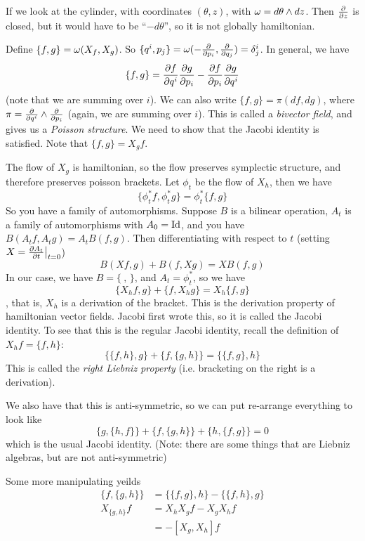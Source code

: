  If we look at the cylinder, with coordinates $(\theta,z)$, with
 $\omega=d\theta\wedge dz$.  Then $\frac{\partial }{\partial z}$ is closed, but it would
 have to be ``$-d\theta$'', so it is not globally hamiltonian.

 Define $\{f,g\} = \omega(X_f,X_g)$.  So $\{q^i,p_j\} =
 \omega(-\frac{\partial }{\partial p_i},\frac{\partial }{\partial q_j})=\delta_j^i$.  In general, we have
 \[
    \{f,g\} = \frac{\partial f}{\partial q^i}\frac{\partial g}{\partial p_i} -
    \frac{\partial f}{\partial p_i}\frac{\partial g}{\partial q^i}
 \]
 (note that we are summing over $i$).  We can also write
 $\{f,g\}=\pi(df,dg)$, where $\pi=\frac{\partial }{\partial q^i}\wedge\frac{\partial }{\partial p_i}$
 (again, we are summing over $i$).  This is called a
 \emph{bivector field}, and gives us a \emph{Poisson structure}.
 We need to show that the Jacobi identity is satisfied.
 Note that $\{f,g\}=X_g f$.

 The flow of $X_g$ is hamiltonian, so the flow preserves
 symplectic structure, and therefore preserves poisson brackets.
 Let $\phi_t$ be the flow of $X_h$, then we have
 \[
    \{\phi_t^*f,\phi_t^* g\} = \phi_t^*\{f,g\}
 \]
 So you have a family of automorphisms.  Suppose $B$ is a bilinear
 operation, $A_t$ is a family of automorphisms with $A_0=\text{\rm Id}$, and you have
 $B(A_tf,A_tg)=A_tB(f,g)$.  Then differentiating with respect to
 $t$ (setting $X=\frac{\partial A_t}{\partial t}{\big|_{t=0}}$)
 \[
    B(Xf,g)+B(f,Xg) = XB(f,g)
 \]
 In our case, we have $B=\{\ ,\, \}$, and $A_t=\phi_t^*$, so we
 have
 \[
    \{X_hf,g\}+\{f,X_hg\} = X_h\{f,g\}
 \]
 , that is, $X_h$ is a derivation of the bracket.  This is the
 derivation property of hamiltonian vector fields.  Jacobi first
 wrote this, so it is called the Jacobi identity.  To see that
 this is the regular Jacobi identity, recall the definition of
 $X_hf = \{f,h\}$:
 \[
   \{\{f,h\},g\}+\{f,\{g,h\}\} = \{\{f,g\},h\}
 \]
 This is called the \emph{right Liebniz property} (i.e. bracketing
 on the right is a derivation).

 We also have that this is anti-symmetric, so we can put
 re-arrange everything to look like
 \[
   \{g,\{h,f\}\}+\{f,\{g,h\}\}+\{h,\{f,g\}\}=0
 \]
 which is the usual Jacobi identity.  (Note: there are some things
 that are Liebniz algebras, but are not anti-symmetric)

 Some more manipulating yeilds
 \begin{align*}
   \{f,\{g,h\}\} &= \{\{f,g\},h\} - \{\{f,h\},g\} \\
   X_{\{g,h\}} f &= X_hX_g f - X_gX_h f\\
            &= -[X_g,X_h]f
 \end{align*}

